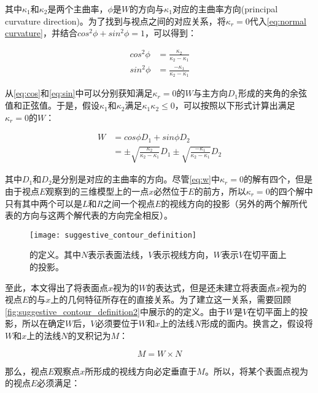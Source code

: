 其中$\kappa_1$和$\kappa_2$是两个主曲率，$\phi$是$W$的方向与$\kappa_1$对应的主曲率方向(principal curvature direction)。为了找到\scon{}与视点之间的对应关系，将$\kappa_r = 0$代入\autoref{eq:normal curvature}，并结合$cos^2\phi + sin^2\phi = 1$，可以得到：

\begin{align}
    cos^2\phi &= \frac{\kappa_2}{\kappa_2-\kappa_1} \label{eq:cos}\\
    sin^2\phi &= \frac{-\kappa_1}{\kappa_2-\kappa_1} \label{eq:sin}
\end{align}

从\autoref{eq:cos}和\autoref{eq:sin}中可以分别获知满足$\kappa_r = 0$的$W$与主方向$D_1$形成的夹角的余弦值和正弦值。于是，假设$\kappa_1$和$\kappa_2$满足$\kappa_1\kappa_2 \leq 0$，可以按照以下形式计算出满足$\kappa_r = 0$的$W$：

\begin{align}
    W &= cos{\phi}D_1+sin{\phi}D_2 \\
    &= \pm\sqrt{\frac{\kappa_2}{\kappa_2-\kappa_1}}D_1\pm\sqrt{\frac{-\kappa_1}{\kappa_2-\kappa_1}}D_2 \label{eq:w}
\end{align}

其中$D_1$和$D_2$是分别是对应的主曲率的方向。尽管\autoref{eq:w}中$\kappa_r = 0$的解有四个，但是由于视点$E$观察到的三维模型上的一点$x$必然位于$E$的前方，所以$\kappa_r = 0$的四个解中只有其中两个可以是$L$和$R$之间一个视点$E$的视线方向的投影（另外的两个解所代表的方向与这两个解代表的方向完全相反）。

\begin{figure}[tbp]
    \centering
    \texttt{[image: suggestive\_contour\_definition]}
    \caption{\label{fig:suggestive_contour_definition2}
    \scon{}的定义。其中$N$表示表面法线，$V$表示视线方向，$W$表示$V$在切平面上的投影。}
\end{figure}

至此，本文得出了将表面点$x$视为\sconp{}的$W$的表达式，但是还未建立将表面点$x$视为\sconp{}的视点$E$的与$x$上的几何特征所存在的直接关系。为了建立这一关系，需要回顾\autoref{fig:suggestive_contour_definition2}中展示的\scon{}的定义。由于$W$是$V$在切平面上的投影，所以在确定$W$后，$V$必须要位于$W$和$x$上的法线$N$形成的面内。换言之，假设将$W$和$x$上的法线$N$的叉积记为$M$：

\begin{equation}\label{eq:suggestive viewpoint}
    M = W \times N
\end{equation}

那么，视点$E$观察点$x$所形成的视线方向必定垂直于$M$。所以，将某个表面点视为\sconp{}的视点$E$必须满足：


